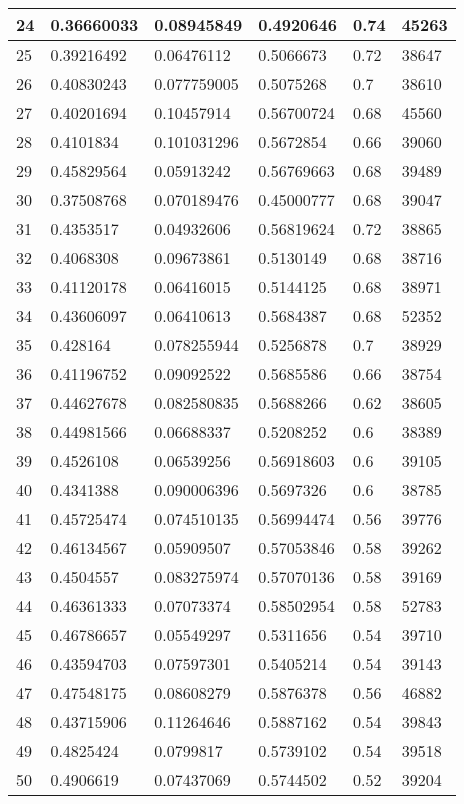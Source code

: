 \begin{longtable}{|l|l|l|l|l|l|}
24 & 0.36660033 & 0.08945849 & 0.4920646 & 0.74 & 45263 \\ \hline 
25 & 0.39216492 & 0.06476112 & 0.5066673 & 0.72 & 38647 \\ \hline 
26 & 0.40830243 & 0.077759005 & 0.5075268 & 0.7 & 38610 \\ \hline 
27 & 0.40201694 & 0.10457914 & 0.56700724 & 0.68 & 45560 \\ \hline 
28 & 0.4101834 & 0.101031296 & 0.5672854 & 0.66 & 39060 \\ \hline 
29 & 0.45829564 & 0.05913242 & 0.56769663 & 0.68 & 39489 \\ \hline 
30 & 0.37508768 & 0.070189476 & 0.45000777 & 0.68 & 39047 \\ \hline 
31 & 0.4353517 & 0.04932606 & 0.56819624 & 0.72 & 38865 \\ \hline 
32 & 0.4068308 & 0.09673861 & 0.5130149 & 0.68 & 38716 \\ \hline 
33 & 0.41120178 & 0.06416015 & 0.5144125 & 0.68 & 38971 \\ \hline 
34 & 0.43606097 & 0.06410613 & 0.5684387 & 0.68 & 52352 \\ \hline 
35 & 0.428164 & 0.078255944 & 0.5256878 & 0.7 & 38929 \\ \hline 
36 & 0.41196752 & 0.09092522 & 0.5685586 & 0.66 & 38754 \\ \hline 
37 & 0.44627678 & 0.082580835 & 0.5688266 & 0.62 & 38605 \\ \hline 
38 & 0.44981566 & 0.06688337 & 0.5208252 & 0.6 & 38389 \\ \hline 
39 & 0.4526108 & 0.06539256 & 0.56918603 & 0.6 & 39105 \\ \hline 
40 & 0.4341388 & 0.090006396 & 0.5697326 & 0.6 & 38785 \\ \hline 
41 & 0.45725474 & 0.074510135 & 0.56994474 & 0.56 & 39776 \\ \hline 
42 & 0.46134567 & 0.05909507 & 0.57053846 & 0.58 & 39262 \\ \hline 
43 & 0.4504557 & 0.083275974 & 0.57070136 & 0.58 & 39169 \\ \hline 
44 & 0.46361333 & 0.07073374 & 0.58502954 & 0.58 & 52783 \\ \hline 
45 & 0.46786657 & 0.05549297 & 0.5311656 & 0.54 & 39710 \\ \hline 
46 & 0.43594703 & 0.07597301 & 0.5405214 & 0.54 & 39143 \\ \hline 
47 & 0.47548175 & 0.08608279 & 0.5876378 & 0.56 & 46882 \\ \hline 
48 & 0.43715906 & 0.11264646 & 0.5887162 & 0.54 & 39843 \\ \hline 
49 & 0.4825424 & 0.0799817 & 0.5739102 & 0.54 & 39518 \\ \hline 
50 & 0.4906619 & 0.07437069 & 0.5744502 & 0.52 & 39204 \\ \hline 
\end{longtable}